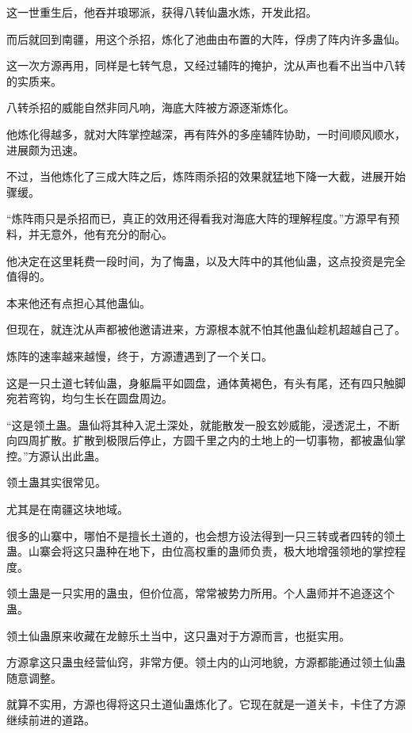 \begin{this_body}
这一世重生后，他吞并琅琊派，获得八转仙蛊水炼，开发此招。

而后就回到南疆，用这个杀招，炼化了池曲由布置的大阵，俘虏了阵内许多蛊仙。

这一次方源再用，同样是七转气息，又经过辅阵的掩护，沈从声也看不出当中八转的实质来。

八转杀招的威能自然非同凡响，海底大阵被方源逐渐炼化。

他炼化得越多，就对大阵掌控越深，再有阵外的多座辅阵协助，一时间顺风顺水，进展颇为迅速。

不过，当他炼化了三成大阵之后，炼阵雨杀招的效果就猛地下降一大截，进展开始骤缓。

“炼阵雨只是杀招而已，真正的效用还得看我对海底大阵的理解程度。”方源早有预料，并无意外，他有充分的耐心。

他决定在这里耗费一段时间，为了悔蛊，以及大阵中的其他仙蛊，这点投资是完全值得的。

本来他还有点担心其他蛊仙。

但现在，就连沈从声都被他邀请进来，方源根本就不怕其他蛊仙趁机超越自己了。

炼阵的速率越来越慢，终于，方源遭遇到了一个关口。

这是一只土道七转仙蛊，身躯扁平如圆盘，通体黄褐色，有头有尾，还有四只触脚宛若弯钩，均匀生长在圆盘周边。

“这是领土蛊。蛊仙将其种入泥土深处，就能散发一股玄妙威能，浸透泥土，不断向四周扩散。扩散到极限后停止，方圆千里之内的土地上的一切事物，都被蛊仙掌控。”方源认出此蛊。

领土蛊其实很常见。

尤其是在南疆这块地域。

很多的山寨中，哪怕不是擅长土道的，也会想方设法得到一只三转或者四转的领土蛊。山寨会将这只蛊种在地下，由位高权重的蛊师负责，极大地增强领地的掌控程度。

领土蛊是一只实用的蛊虫，但价位高，常常被势力所用。个人蛊师并不追逐这个蛊。

领土仙蛊原来收藏在龙鲸乐土当中，这只蛊对于方源而言，也挺实用。

方源拿这只蛊虫经营仙窍，非常方便。领土内的山河地貌，方源都能通过领土仙蛊随意调整。

就算不实用，方源也得将这只土道仙蛊炼化了。它现在就是一道关卡，卡住了方源继续前进的道路。

\end{this_body}

